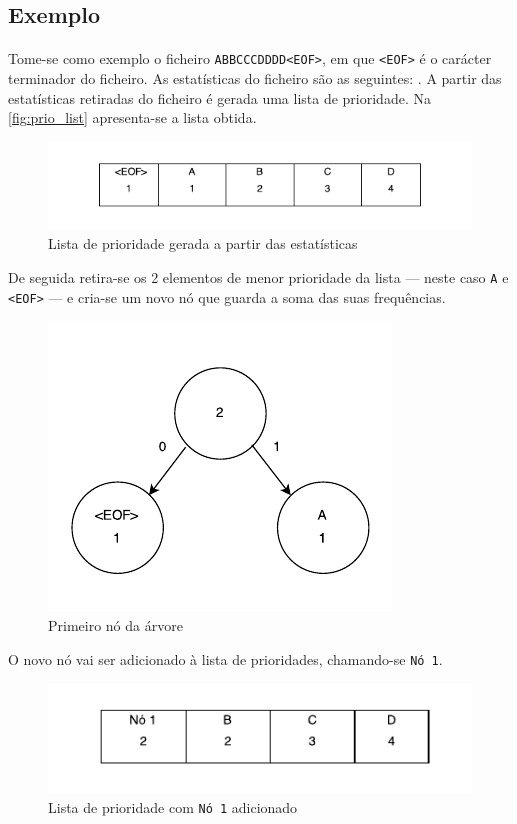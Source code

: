\subsection{Exemplo}

\paragraph{} Tome-se como exemplo o ficheiro \texttt{ABBCCCDDDD<EOF>}, em que \texttt{<EOF>} é o carácter terminador do ficheiro. As estatísticas do ficheiro são as seguintes: \texttt{}. A partir das estatísticas retiradas do ficheiro é gerada uma lista de prioridade. Na \autoref{fig:prio_list} apresenta-se a lista obtida.

\begin{figure}[H]
  \centering
  \includegraphics[width=.75\textwidth]{img/prio_list}
  \caption{Lista de prioridade gerada a partir das estatísticas}
  \label{fig:prio_list}
\end{figure}

De seguida retira-se os 2 elementos de menor prioridade da lista --- neste caso \texttt{A} e \texttt{<EOF>} --- e cria-se um novo nó que guarda a soma das suas frequências.

\begin{figure}[H]
  \centering
  \includegraphics[width=.5\textwidth]{img/trie_1}
  \caption{Primeiro nó da árvore}
  \label{fig:trie_1}
\end{figure}

O novo nó vai ser adicionado à lista de prioridades, chamando-se \texttt{Nó 1}.

\begin{figure}[H]
  \centering
  \includegraphics[width=.65\textwidth]{img/prio_list_2}
  \caption{Lista de prioridade com \texttt{Nó 1} adicionado}
  \label{fig:prio_list_2}
\end{figure}

